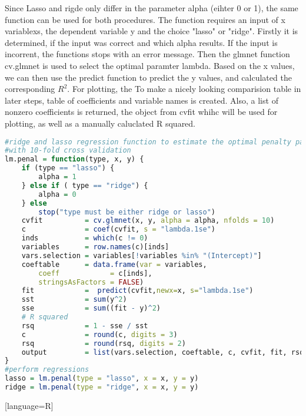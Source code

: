 Since Lasso and rigde only differ in the parameter alpha (eihter 0
or 1), the same function can be used for both procedures. 
The function requires an input of x variablexs, the dependent variable y and the choice "lasso" or "ridge". Firstly it is determined, if the input was correct and which alpha results. If the input is incorrent, the functions stops with an error message.
Then the glmnet function cv.glmnet is used to select the optimal paramter lambda. 
Based on the x values, we can then use the predict function to predict the y values, and calculated the corresponding $R^{2}$.
For plotting, the  To make a nicely looking comparision table in later steps, table of coefficients and variable names is created. Also, a list of nonzero coefficients is returned, the object from cvfit whihc will be used for plotting, as well as a manually caluclated R squared.
\begin{lstlisting}[language=R]
#ridge and lasso regression function to estimate the optimal penalty parameter lambda
#with 10-fold cross validation
lm.penal = function(type, x, y) {
    if (type == "lasso") {
        alpha = 1
    } else if ( type == "ridge") {
        alpha = 0
    } else
        stop("type must be either ridge or lasso")
    cvfit          = cv.glmnet(x, y, alpha = alpha, nfolds = 10)
    c              = coef(cvfit, s = "lambda.1se")
    inds           = which(c != 0)
    variables      = row.names(c)[inds]
    vars.selection = variables[!variables %in% "(Intercept)"]
    coeftable      = data.frame(var = variables,
        coeff            = c[inds],
        stringsAsFactors = FALSE)
    fit            =  predict(cvfit,newx=x, s="lambda.1se")
    sst            = sum(y^2)
    sse            = sum((fit - y)^2)
    # R squared
    rsq            = 1 - sse / sst
    c              = round(c, digits = 3)
    rsq            = round(rsq, digits = 2)
    output         = list(vars.selection, coeftable, c, cvfit, fit, rsq)
}
#perform regressions
lasso = lm.penal(type = "lasso", x = x, y = y)
ridge = lm.penal(type = "ridge", x = x, y = y)
\end{lstlisting}[language=R]



